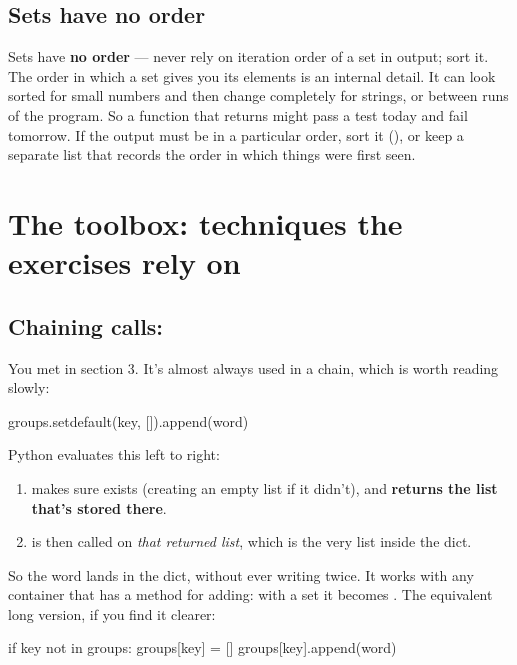 \documentclass[10pt,a4paper]{article}
\begin{document}
\subsection{Sets have no order}
Sets have \textbf{no order} — never rely on iteration order of a set in output; sort it.
The order in which a set gives you its elements is an internal detail. It can look sorted for small numbers and then change completely for strings, or between runs of the program. So a function that returns  might pass a test today and fail tomorrow. If the output must be in a particular order, sort it (), or keep a separate list that records the order in which things were first seen.
\setcounter{section}{8}
\section{The toolbox: techniques the exercises rely on}
\subsection{Chaining calls: }
You met  in section 3. It’s almost always used in a chain, which is worth reading slowly:
\begin{pycode}
groups.setdefault(key, []).append(word)
\end{pycode}
Python evaluates this left to right:
\begin{enumerate}
\item {} makes sure  exists (creating an empty list if it didn’t), and \textbf{returns the list that’s stored there}.
\item {} is then called on \emph{that returned list}, which is the very list inside the dict.
\end{enumerate}
So the word lands in the dict, without ever writing  twice. It works with any container that has a method for adding: with a set it becomes .
The equivalent long version, if you find it clearer:
\begin{pycode}
if key not in groups:
    groups[key] = []
groups[key].append(word)
\end{pycode}
\end{document}
